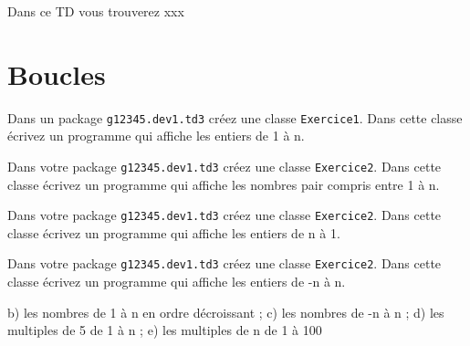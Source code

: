 \documentclass[a4paper,11pt]{article}
\date{2018 -- 2019}
\begin{document}
\entete
\titre
{}
\lastedit


	Dans ce TD vous trouverez xxx
	\tableofcontents

	\newpage

\section{Boucles}
 
	\begin{Exercice}{}	
		Dans un package \texttt{g12345.dev1.td3} créez une classe \texttt{Exercice1}.
		Dans cette classe écrivez un programme qui affiche les entiers de 1 à n.
	\end{Exercice}

	\begin{Exercice}{}	
		Dans votre package \texttt{g12345.dev1.td3} créez une classe \texttt{Exercice2}.
		Dans cette classe écrivez un programme qui affiche les nombres pair compris entre 1 à n.
	\end{Exercice}


	\begin{Exercice}{}	
		Dans votre package \texttt{g12345.dev1.td3} créez une classe \texttt{Exercice2}.
		Dans cette classe écrivez un programme qui affiche les entiers de n à 1.
	\end{Exercice}

	\begin{Exercice}{}	
		Dans votre package \texttt{g12345.dev1.td3} créez une classe \texttt{Exercice2}.
		Dans cette classe écrivez un programme qui affiche les entiers de -n à n.
	\end{Exercice}


b) les nombres de 1 à n en ordre décroissant ;
c) les nombres de -n à n ;
d) les multiples de 5 de 1 à n ;
e) les multiples de n de 1 à 100

 

\end{document}
